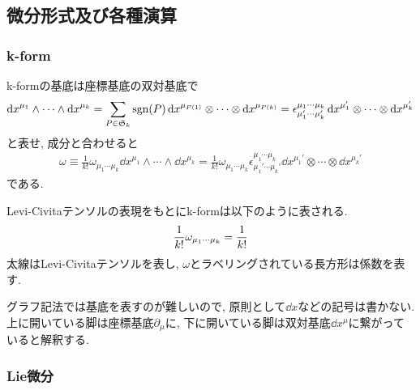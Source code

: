 \documentclass[dvipdfmx]{jsarticle}
\begin{document}
\subsection{微分形式及び各種演算}

\subsubsection{k-form}

k-formの基底は座標基底の双対基底で
\begin{align*}
    \dd{x}^{\mu_1}\wedge\cdots\wedge\dd{x}^{\mu_k}
    =
    \sum_{P\in\mathfrak{S}_k}\mathrm{sgn}(P)\dd{x}^{\mu_{P(1)}}\otimes\cdots\otimes\dd{x}^{\mu_{P(k)}}
    =
    \epsilon^{\mu_1\cdots\mu_k}_{\mu_1'\cdots\mu_k'}\dd{x}^{\mu_1'}\otimes\cdots\otimes\dd{x}^{\mu_k'}
\end{align*}
と表せ, 成分と合わせると
\begin{align*}
    \omega
    \equiv
    \frac{1}{k!}
    \omega_{\mu_1\cdots\mu_k}\dd{x}^{\mu_1}\wedge\cdots\wedge\dd{x}^{\mu_k}
    =
    \frac{1}{k!}
    \omega_{\mu_1\cdots\mu_k}\epsilon^{\mu_1\cdots\mu_k}_{\mu_1'\cdots\mu_k'}
    \dd{x}^{\mu_1'}\otimes\cdots\otimes\dd{x}^{\mu_k'}
\end{align*}
である.

Levi-Civitaテンソルの表現をもとにk-formは以下のように表される.
\begin{equation*}
    \frac{1}{k!}
    \omega_{\mu_1\cdots\mu_k}
    =
    \frac{1}{k!}
    \vcenter{\hbox{}}
\end{equation*}
太線はLevi-Civitaテンソルを表し, $\omega$とラベリングされている長方形は係数を表す.

グラフ記法では基底を表すのが難しいので, 原則として$\dd{x}$などの記号は書かない.
上に開いている脚は座標基底$\partial_\mu$に, 下に開いている脚は双対基底$\dd{x}^\mu$に繋がっていると解釈する.


\subsubsection{Lie微分}
\end{document}
